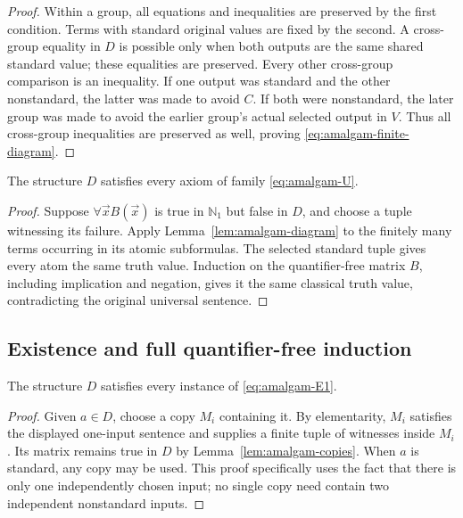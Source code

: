 \begin{proof}
Within a group, all equations and inequalities are preserved by the
first condition. Terms with standard original values are fixed by the
second. A cross-group equality in $D$ is possible only when both
outputs are the same shared standard value; these equalities are
preserved. Every other cross-group comparison is an inequality. If
one output was standard and the other nonstandard, the latter was made
to avoid $C$. If both were nonstandard, the later group was made to
avoid the earlier group's actual selected output in $V$. Thus all
cross-group inequalities are preserved as well, proving
\eqref{eq:amalgam-finite-diagram}.
\end{proof}

\begin{proposition}
\label{prop:amalgam-universal}
The structure $D$ satisfies every axiom of family
\eqref{eq:amalgam-U}.
\end{proposition}
\begin{proof}
Suppose $\forall\vec x B(\vec x)$ is true in $\mathbb N_1$
but false in $D$, and choose a tuple witnessing its failure. Apply
Lemma~\ref{lem:amalgam-diagram} to the finitely many terms occurring
in its atomic subformulas. The selected standard tuple gives every
atom the same truth value. Induction on the quantifier-free matrix
$B$, including implication and negation, gives it the same classical
truth value, contradicting the original universal sentence.
\end{proof}

\subsection{Existence and full quantifier-free induction}
\label{subsec:amalgam-induction}

\begin{proposition}
\label{prop:amalgam-one-input}
The structure $D$ satisfies every instance of
\eqref{eq:amalgam-E1}.
\end{proposition}
\begin{proof}
Given $a\in D$, choose a copy $M_i$ containing it. By elementarity,
$M_i$ satisfies the displayed one-input sentence and supplies a finite
tuple of witnesses inside $M_i$. Its matrix remains true in $D$
by Lemma~\ref{lem:amalgam-copies}. When $a$ is standard, any copy
may be used. This proof specifically uses the fact that there is only
one independently chosen input; no single copy need contain two
independent nonstandard inputs.
\end{proof}

